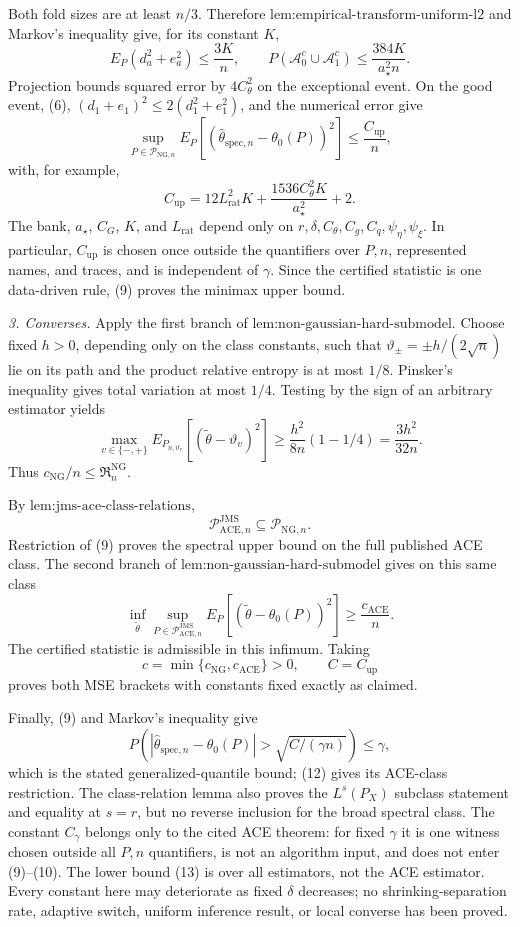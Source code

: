 Both fold sizes are at least \(n/3\).  Therefore \(\text{lem:empirical-transform-uniform-l2}\) and Markov's inequality give, for its constant \(K\),
\[
 E_P(d_a^2+e_a^2)\le\frac{3K}{n},
 \qquad
 P(\mathcal A_0^c\cup\mathcal A_1^c)
 \le\frac{384K}{a_{\star}^2n}. \tag{8}
\]
Projection bounds squared error by \(4C_{\theta}^2\) on the exceptional event.  On the good event, (6), \((d_1+e_1)^2\le2(d_1^2+e_1^2)\), and the numerical error give
\[
 \sup_{P\in\mathcal P_{\mathrm{NG},n}}
 E_P[(\widehat\theta_{\mathrm{spec},n}-\theta_0(P))^2]
 \le\frac{C_{\mathrm{up}}}{n}, \tag{9}
\]
with, for example,
\[
 C_{\mathrm{up}}
 =12L_{\mathrm{rat}}^2K
 +\frac{1536C_{\theta}^2K}{a_{\star}^2}+2. \tag{10}
\]
The bank, \(a_{\star}\), \(C_G\), \(K\), and \(L_{\mathrm{rat}}\) depend only on \(r,\delta,C_{\theta},C_g,C_q,\psi_{\eta},\psi_{\xi}\).  In particular, \(C_{\mathrm{up}}\) is chosen once outside the quantifiers over \(P,n\), represented names, and traces, and is independent of \(\gamma\).  Since the certified statistic is one data-driven rule, (9) proves the minimax upper bound.

\emph{3. Converses.}  Apply the first branch of \(\text{lem:non-gaussian-hard-submodel}\).  Choose fixed \(h>0\), depending only on the class constants, such that \(\vartheta_{\pm}=\pm h/(2\sqrt n)\) lie on its path and the product relative entropy is at most \(1/8\).  Pinsker's inequality gives total variation at most \(1/4\).  Testing by the sign of an arbitrary estimator yields
\[
 \max_{v\in\{-,+\}}
 E_{P_{n,\vartheta_v}}[(\widetilde\theta-\vartheta_v)^2]
 \ge\frac{h^2}{8n}(1-1/4)
 =\frac{3h^2}{32n}. \tag{11}
\]
Thus \(c_{\mathrm{NG}}/n\le\mathfrak R_n^{\mathrm{NG}}\).

By \(\text{lem:jms-ace-class-relations}\),
\[
 \mathcal P_{\mathrm{ACE},n}^{\mathrm{JMS}}
 \subseteq\mathcal P_{\mathrm{NG},n}. \tag{12}
\]
Restriction of (9) proves the spectral upper bound on the full published ACE class.  The second branch of \(\text{lem:non-gaussian-hard-submodel}\) gives on this same class
\[
 \inf_{\widetilde\theta}
 \sup_{P\in\mathcal P_{\mathrm{ACE},n}^{\mathrm{JMS}}}
 E_P[(\widetilde\theta-\theta_0(P))^2]
 \ge\frac{c_{\mathrm{ACE}}}{n}. \tag{13}
\]
The certified statistic is admissible in this infimum.  Taking
\[
 c=\min\{c_{\mathrm{NG}},c_{\mathrm{ACE}}\}>0,
 \qquad C=C_{\mathrm{up}}
\]
proves both MSE brackets with constants fixed exactly as claimed.

Finally, (9) and Markov's inequality give
\[
 P\left(
 |\widehat\theta_{\mathrm{spec},n}-\theta_0(P)|
 >\sqrt{C/(\gamma n)}
 \right)\le\gamma,
\]
which is the stated generalized-quantile bound; (12) gives its ACE-class restriction.  The class-relation lemma also proves the \(L^s(P_X)\) subclass statement and equality at \(s=r\), but no reverse inclusion for the broad spectral class.  The constant \(C_{\gamma}\) belongs only to the cited ACE theorem: for fixed \(\gamma\) it is one witness chosen outside all \(P,n\) quantifiers, is not an algorithm input, and does not enter (9)--(10).  The lower bound (13) is over all estimators, not the ACE estimator.  Every constant here may deteriorate as fixed \(\delta\) decreases; no shrinking-separation rate, adaptive switch, uniform inference result, or local converse has been proved.